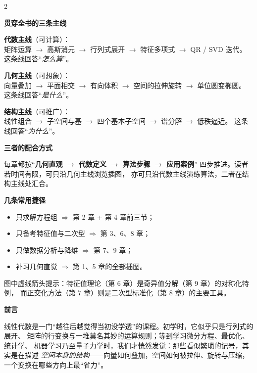 \documentclass[11pt,a4paper,openany]{ctexbook}
\renewcommand{\cleardoublepage}{\clearpage}
\newcommand{\minihead}[1]{%
  \par\addvspace{8pt}%
  {\noindent\sffamily\bfseries\large\color{qing} #1\par}%
  \vspace{-4pt}\noindent{\color{qing!28}\rule{\linewidth}{0.6pt}}\par\vspace{5pt}}
\begin{document}
\vspace{0.35cm}

\begin{multicols}{2}
\sffamily\small{}
\minihead{贯穿全书的三条主线}

\textbf{代数主线}（可计算）：\\
矩阵运算 $\to$ 高斯消元 $\to$ 行列式展开 $\to$ 特征多项式 $\to$ QR / SVD 迭代。
这条线回答“\emph{怎么算}”。

\textbf{几何主线}（可想象）：\\
向量叠加 $\to$ 平面相交 $\to$ 有向体积 $\to$ 空间的拉伸旋转 $\to$ 单位圆变椭圆。
这条线回答“\emph{是什么}”。

\textbf{结构主线}（可推广）：\\
线性组合 $\to$ 子空间与基 $\to$ 四个基本子空间 $\to$ 谱分解 $\to$ 低秩逼近。
这条线回答“\emph{为什么}”。

\minihead{三者的配合方式}

每章都按“\textbf{几何直观 $\to$ 代数定义 $\to$ 算法步骤 $\to$ 应用案例}”
四步推进。读者若时间有限，可只沿几何主线浏览插图，
亦可只沿代数主线演练算法，二者在结构主线处汇合。

\minihead{几条常用捷径}

\begin{itemize}[leftmargin=1.4em]
\item 只求解方程组 $\Rightarrow$ 第 2 章 + 第 4 章前三节；
\item 只备考特征值与二次型 $\Rightarrow$ 第 3、6、8 章；
\item 只做数据分析与降维 $\Rightarrow$ 第 7、9 章；
\item 补习几何直觉 $\Rightarrow$ 第 1、5 章的全部插图。
\end{itemize}
\end{multicols}

\vfill
\noindent\sffamily\footnotesize\color{inkl}
图中虚线箭头提示：特征值理论（第 6 章）是奇异值分解（第 9 章）的对称化特例，
而正交化方法（第 7 章）则是二次型标准化（第 8 章）的主要工具。

\cleardoublepage
\thispagestyle{empty}
\vspace*{1.2cm}
{\sffamily\bfseries\Large\color{qing}前\quad 言\par}
\vspace{4pt}\noindent{\color{qing}\rule{\textwidth}{0.8pt}}\par
\vspace{0.5cm}

线性代数是一门“越往后越觉得当初没学透”的课程。初学时，它似乎只是行列式的展开、
矩阵的行变换与一堆莫名其妙的运算规则；等到学习微分方程、最优化、统计学、
机器学习乃至量子力学时，我们才恍然发觉：那些看似繁琐的记号，其实是在描述
\emph{空间本身的结构}——向量如何叠加，空间如何被拉伸、旋转与压缩，
一个变换在哪些方向上最“省力”。
\end{document}
